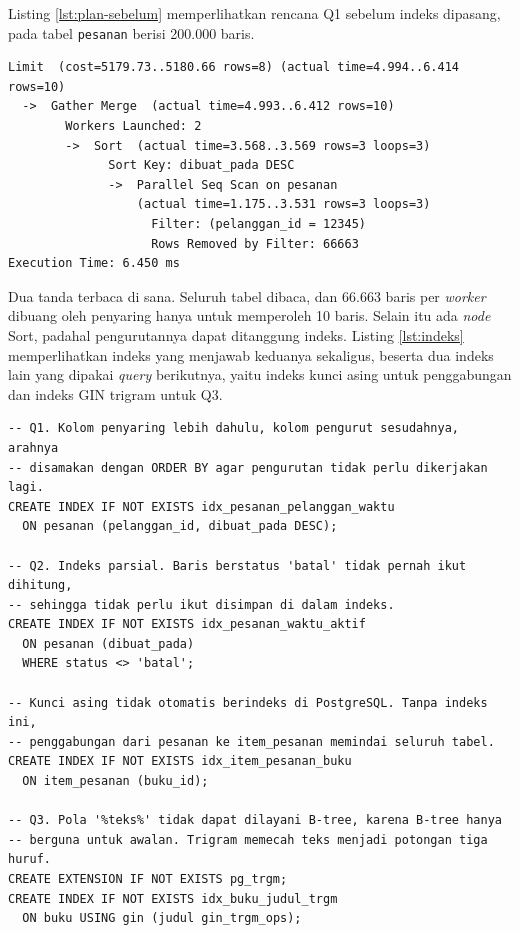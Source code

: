 Listing \ref{lst:plan-sebelum} memperlihatkan rencana Q1 sebelum indeks
dipasang, pada tabel \texttt{pesanan} berisi 200.000 baris.

\begin{lstlisting}[style=SqlStyle, caption={Rencana Q1 sebelum indeks dipasang, dihasilkan oleh \berkas{sources/chapter03/03-query-baseline.sql} lalu dirapikan}, label={lst:plan-sebelum}]
Limit  (cost=5179.73..5180.66 rows=8) (actual time=4.994..6.414 rows=10)
  ->  Gather Merge  (actual time=4.993..6.412 rows=10)
        Workers Launched: 2
        ->  Sort  (actual time=3.568..3.569 rows=3 loops=3)
              Sort Key: dibuat_pada DESC
              ->  Parallel Seq Scan on pesanan
                  (actual time=1.175..3.531 rows=3 loops=3)
                    Filter: (pelanggan_id = 12345)
                    Rows Removed by Filter: 66663
Execution Time: 6.450 ms
\end{lstlisting}

Dua tanda terbaca di sana. Seluruh tabel dibaca, dan 66.663 baris per \textit{worker}
dibuang oleh penyaring hanya untuk memperoleh 10 baris. Selain itu ada \textit{node}
Sort, padahal pengurutannya dapat ditanggung indeks. Listing \ref{lst:indeks}
memperlihatkan indeks yang menjawab keduanya sekaligus, beserta dua indeks lain
yang dipakai \textit{query} berikutnya, yaitu indeks kunci asing untuk penggabungan dan
indeks GIN trigram untuk Q3.

\begin{lstlisting}[style=SqlStyle, caption={Empat indeks perbaikan, tersedia di \berkas{sources/chapter03/04-indeks.sql}}, label={lst:indeks}]
-- Q1. Kolom penyaring lebih dahulu, kolom pengurut sesudahnya, arahnya
-- disamakan dengan ORDER BY agar pengurutan tidak perlu dikerjakan lagi.
CREATE INDEX IF NOT EXISTS idx_pesanan_pelanggan_waktu
  ON pesanan (pelanggan_id, dibuat_pada DESC);

-- Q2. Indeks parsial. Baris berstatus 'batal' tidak pernah ikut dihitung,
-- sehingga tidak perlu ikut disimpan di dalam indeks.
CREATE INDEX IF NOT EXISTS idx_pesanan_waktu_aktif
  ON pesanan (dibuat_pada)
  WHERE status <> 'batal';

-- Kunci asing tidak otomatis berindeks di PostgreSQL. Tanpa indeks ini,
-- penggabungan dari pesanan ke item_pesanan memindai seluruh tabel.
CREATE INDEX IF NOT EXISTS idx_item_pesanan_buku
  ON item_pesanan (buku_id);

-- Q3. Pola '%teks%' tidak dapat dilayani B-tree, karena B-tree hanya
-- berguna untuk awalan. Trigram memecah teks menjadi potongan tiga huruf.
CREATE EXTENSION IF NOT EXISTS pg_trgm;
CREATE INDEX IF NOT EXISTS idx_buku_judul_trgm
  ON buku USING gin (judul gin_trgm_ops);
\end{lstlisting}

